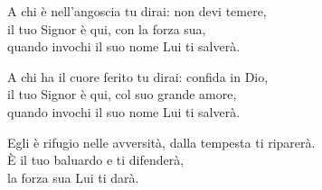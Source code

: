 
\strofa A chi è nell'angoscia tu dirai: non devi temere,\\
il tuo Signor è qui, con la forza sua,\\
quando invochi il suo nome Lui ti salverà.

\spazio


\spazio

\strofa A chi ha il cuore ferito tu dirai: confida in Dio,\\
il tuo Signor è qui, col suo grande amore,\\
quando invochi il suo nome Lui ti salverà.

\spazio


\spazio

\strofa Egli è rifugio nelle avversità, dalla tempesta ti riparerà.\\
È il tuo baluardo e ti difenderà,\\
la forza sua Lui ti darà.

\spazio


